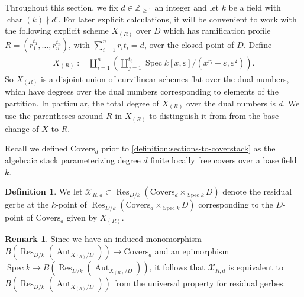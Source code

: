 \documentclass[12 pt]{amsart}
\theoremstyle{plain}
\theoremstyle{definition}
\newtheorem{definition}[theorem]{Definition}
\newtheorem{remark}[theorem]{Remark}
\theoremstyle{remark}
\numberwithin{equation}{section}
\newcommand\bz{\mathbb Z}
\newcommand\scx{\mathscr X}
\DeclareMathOperator\spec{\operatorname{Spec}}
\newcommand\coverstack[1]{\mathrm{Covers}_{d}} %
\newcommand\gerbe[2]{\scx_{#1,#2}} %
\DeclareMathOperator\res{Res}
\DeclareMathOperator\chr{\operatorname{char}}
\DeclareMathOperator\aut{Aut}
\begin{document}
Throughout this section, we fix
$d \in \bz_{\geq 1}$ an integer and let $k$ be a field with $\chr(k) \nmid d!$.
For later explicit calculations, it will be convenient to  work with the
following explicit scheme $X_{(R)}$
over $D$ which has ramification profile $R =(r_1^{t_1}, \ldots, r_n^{t_n})$,
with $\sum_{i=1}^n r_i t_i = d$,
over the closed point of $D$. Define
\begin{align} \label{equation:X} 
	X_{(R)} :=
	\coprod_{i=1}^n \left(\coprod_{j=1}^{t_i} \spec k[x,
	\varepsilon]/(x^{r_i}-\varepsilon, \varepsilon^2) \right).
\end{align} 
So $X_{(R)}$ is a disjoint union of curvilinear schemes flat over the dual
numbers, which have degrees over the dual numbers corresponding to elements of
the partition. In particular, the total degree of $X_{(R)}$ over the dual
numbers is $d$.
We use the parentheses around $R$ in $X_{(R)}$ to distinguish it from
from the base change of $X$ to $R$.

Recall we defined $\coverstack d$ prior to
\autoref{definition:sections-to-coverstack} as the algebraic stack
parameterizing degree $d$ finite
locally free covers over a base field $k$.
\begin{definition}
	\label{definition:}
	We let $\gerbe R d \subset \res_{D/k}(\coverstack d \times_{\spec k} D)$
denote the residual gerbe at the $k$-point of
$\res_{D/k}(\coverstack d \times_{\spec k} D)$
corresponding to the $D$-point of $\coverstack d$
given by $X_{(R)}$.
\end{definition}

\begin{remark}
	\label{remark:residual-gerbe-trivial}
	Since we have an induced monomorphism $B(\res_{D/k}(\aut_{X_{(R)}/D})) \to
\coverstack d$ and an epimorphism $\spec k \to B(\res_{D/k}(\aut_{X_{(R)}/D}))$,
it follows that $\gerbe R d$ is equivalent to $B(\res_{D/k}(\aut_{X_{(R)}/D}))$
from the universal property for residual gerbes.
\end{remark}
\end{document}
